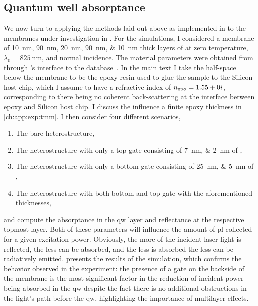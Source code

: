 \subsection{Quantum well absorptance}\label{subsec:exp:tmm:absorptance}
We now turn to applying the methods laid out above as implemented in \pymoosh to the membranes under investigation in \thethesis.
For the simulations, I considered a membrane of \qtylist[list-units = single, list-separator = {/}, list-final-separator = {/}]{10;90;20;90;10}{\nano\meter} thick layers of  at zero temperature, $\lambda_0 = \qty{825}{\nano\meter}$, and normal incidence.
The material parameters were obtained from  through \pymoosh's interface to the  database~\cite{Polyanskiy2024}.
In the main text I take the half-space below the membrane to be the epoxy resin used to glue the sample to the Silicon host chip, which I assume to have a refractive index of $n_{\mathrm{epo}} = 1.55 + 0i$,
corresponding to there being no coherent back-scattering at the interface between epoxy and Silicon host chip.
I discuss the influence a finite epoxy thickness in \cref{ch:app:exp:tmm}.
I then consider four different scenarios,
\begin{enumerate}
    \item The bare heterostructure,
    \item The heterostructure with only a top gate consisting of \qtylist[list-units = single, list-pair-separator = {/}]{7;2}{\nano\meter} of ,
    \item The heterostructure with only a bottom gate consisting of \qtylist[list-units = single, list-pair-separator = {/}]{25;5}{\nano\meter} of ,
    \item The heterostructure with both bottom and top gate with the aforementioned thicknesses,
\end{enumerate}
and compute the absorptance \absorptance in the \gls{qw} layer and reflectance  at the respective topmost layer.
Both of these parameters will influence the amount of \gls{pl} collected for a given excitation power.
Obviously, the more of the incident laser light is reflected, the less can be absorbed, and the less is absorbed the less can be radiatively emitted.
 presents the results of the simulation, which confirms the behavior observed in the experiment: the presence of a gate on the backside of the membrane is the most significant factor in the reduction of incident power being absorbed in the \gls{qw} despite the fact there is no additional obstructions in the light's path before the \gls{qw}, highlighting the importance of multilayer effects.

